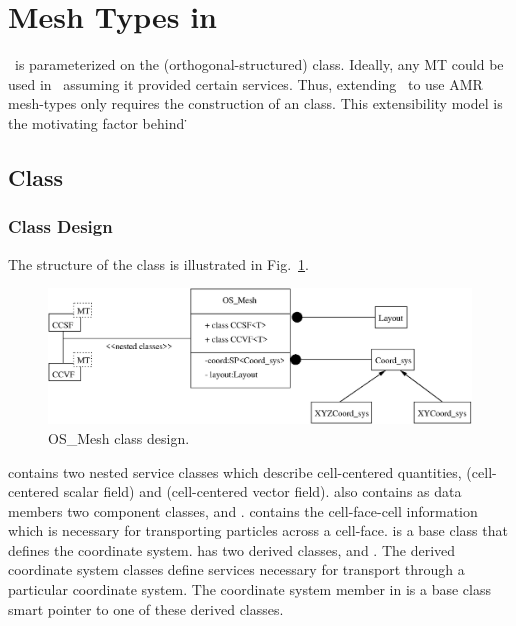 
\section{Mesh Types in \imctest}

\imctest\ is parameterized on the  (orthogonal-structured) 
class.  Ideally, any MT could be used in \imctest\ assuming it provided 
certain services.  Thus, extending \imctest\ to use AMR mesh-types only 
requires the construction of an  class.  This
extensibility model is the motivating factor behind \draco\.

\subsection{ Class}

\subsubsection{Class Design}

The structure of the  class is illustrated in
Fig.~\ref{fig:os_mesh}.
\begin{figure}
\centerline{
\includegraphics[width=5in]{os_mesh.eps}}
\caption{OS\_Mesh class design.}
\label{fig:os_mesh}
\end{figure}
 contains two nested service
classes which describe cell-centered quantities, 
(cell-centered scalar field) and  (cell-centered vector
field).   also contains as data members two component
classes,  and .   contains the
cell-face-cell information which is necessary for transporting
particles across a cell-face.   is a base class that
defines the coordinate system.   has two derived
classes,  and .  The derived
coordinate system classes define services necessary for transport
through a particular coordinate system.  The coordinate system member
in  is a base class smart pointer to one of these derived 
classes.

